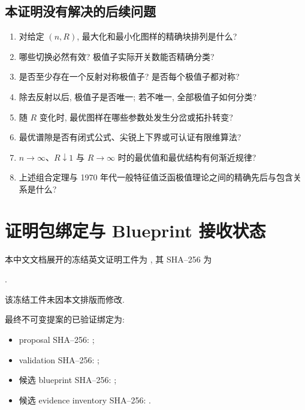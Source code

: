 \documentclass[UTF8]{ctexart}
\begin{document}
\subsection{本证明没有解决的后续问题}

\begin{enumerate}
	\item 对给定 $(n,R)$, 最大化和最小化图样的精确块排列是什么?
	\item 哪些切换必然有效? 极值子实际开关数能否精确分类?
	\item 是否至少存在一个反射对称极值子? 是否每个极值子都对称?
	\item 除去反射以后, 极值子是否唯一; 若不唯一, 全部极值子如何分类?
	\item 随 $R$ 变化时, 最优图样在哪些参数处发生分岔或拓扑转变?
	\item 最优谱隙是否有闭式公式、尖锐上下界或可认证有限维算法?
	\item $n\to\infty$、$R\downarrow1$ 与 $R\to\infty$ 时的最优值和最优结构有何渐近规律?
	\item 上述组合定理与 1970 年代一般特征值泛函极值理论之间的精确先后与包含关系是什么?
\end{enumerate}

\section{证明包绑定与 Blueprint 接收状态}

本中文文档展开的冻结英文证明工件为
\texttt{}, 其 SHA--256 为
\begin{center}
	\texttt{}.
\end{center}
该冻结工件未因本文排版而修改.

最终不可变提案的已验证绑定为:
\begin{itemize}
	\item proposal SHA--256: \texttt{};
	\item validation SHA--256: \texttt{};
	\item 候选 blueprint SHA--256: \texttt{};
	\item 候选 evidence inventory SHA--256: \texttt{}.
\end{itemize}
\end{document}
